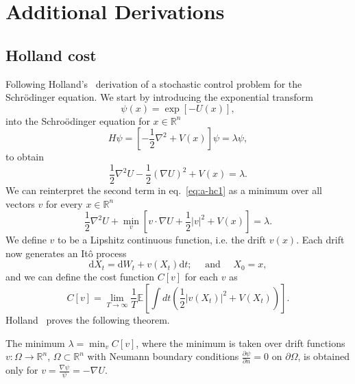 
\chapter{Additional Derivations}

\section{Holland cost}
\label{app:holland-cost}
Following Holland's~\cite{holland1977cost} derivation of a stochastic control problem for the Schr\" odinger equation. We start by introducing the exponential transform
\begin{equation}
	\psi(x)=\exp [-U(x)],
\end{equation}
into the Schro\" odinger equation for $x \in \mathbb{R}^{n}$
\begin{equation}
	H \psi=\left[-\frac{1}{2} \nabla^{2}+V(x)\right] \psi=\lambda \psi,
\end{equation}
to obtain
\begin{equation}
	\label{eq:a-hc1}
	\frac{1}{2} \nabla^{2} U-\frac{1}{2}(\nabla U)^{2}+V(x)=\lambda.
\end{equation}
We can reinterpret the second term in eq.~\eqref{eq:a-hc1} as a minimum over all vectors $v$ for every $x \in \mathbb{R}^{n}$
\begin{equation}
	\label{eq:a-hc2}
	\frac{1}{2} \nabla^{2} U+\min_{v}\left[v \cdot \nabla U+\frac{1}{2}|v|^{2}+V(x)\right]=\lambda.
\end{equation}
We define $v$ to be a Lipshitz continuous function, i.e. the drift $v(x)$. Each drift now generates an It\^ o process
\begin{equation}
	\label{eq:a-hc3}
	\mathrm{d}X_{t}=\mathrm{d}W_{t}+v\left(X_{t}\right) \mathrm{d}t; \quad \text{ and } \quad X_0 = x,
\end{equation}
and we can define the cost function $C[v]$ for each $v$ as
\begin{equation}
	\label{eq:a-hc4}
	C[v]=\lim _{T \rightarrow \infty} \frac{1}{T} \mathbb{E}\left[\int d t\left(\frac{1}{2}\left|v\left(X_{t}\right)\right|^{2}+V\left(X_{t}\right)\right)\right].
\end{equation}
Holland~\cite{holland1977cost} proves the following theorem.
\begin{theorem}
	The minimum $\lambda = \min_{v} C[v]$, where the minimum is taken over drift functions $v: \Omega \rightarrow \mathbb{R}^n$, $\Omega \subset \mathbb{R}^n$ with Neumann boundary conditions $\frac{\partial \psi}{\partial n}=0 \text{ on } \partial \Omega$, is obtained only for $v=\frac{\nabla \psi}{\psi}=-\nabla U$.
\end{theorem}

